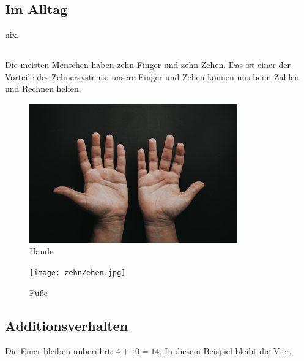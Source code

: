 \documentclass[a4paper]{amsart}
\theoremstyle{definition}
\begin{document}
\subsection{Im Alltag}
nix.

\subsection{}
Die meisten Menschen haben zehn Finger und zehn Zehen. Das ist einer der Vorteile des Zehnersystems: unsere Finger und Zehen können uns beim Zählen und Rechnen helfen.

\begin{figure}
   \includegraphics[height=6cm]{zehnFinger luis-quintero-qKspdY9XUzs-unsplash.jpg}
   \caption{Hände}
\end{figure}


\begin{figure}
   \texttt{[image: zehnZehen.jpg]}
   \caption{Füße}
\end{figure}

\subsection{Additionsverhalten}
Die Einer bleiben unberührt: $4 + 10 = 14$. In diesem Beispiel bleibt die Vier.

\end{document}
